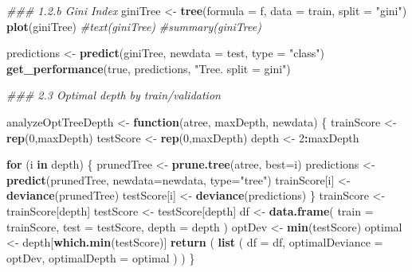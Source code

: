 \documentclass[
]{article}
\newenvironment{Shaded}{\begin{snugshade}}{\end{snugshade}}
\newcommand{\CommentTok}[1]{\textcolor[rgb]{0.56,0.35,0.01}{\textit{#1}}}
\newcommand{\ControlFlowTok}[1]{\textcolor[rgb]{0.13,0.29,0.53}{\textbf{#1}}}
\newcommand{\DataTypeTok}[1]{\textcolor[rgb]{0.13,0.29,0.53}{#1}}
\newcommand{\DecValTok}[1]{\textcolor[rgb]{0.00,0.00,0.81}{#1}}
\newcommand{\KeywordTok}[1]{\textcolor[rgb]{0.13,0.29,0.53}{\textbf{#1}}}
\newcommand{\NormalTok}[1]{#1}
\newcommand{\OperatorTok}[1]{\textcolor[rgb]{0.81,0.36,0.00}{\textbf{#1}}}
\newcommand{\StringTok}[1]{\textcolor[rgb]{0.31,0.60,0.02}{#1}}
\begin{document}
\begin{Shaded}
\begin{Highlighting}[]
\CommentTok{\#\#\# 1.2.b Gini Index}
\NormalTok{giniTree <{-}}\StringTok{ }\KeywordTok{tree}\NormalTok{(}\DataTypeTok{formula =}\NormalTok{ f, }\DataTypeTok{data =}\NormalTok{ train, }\DataTypeTok{split =} \StringTok{"gini"}\NormalTok{)}
\KeywordTok{plot}\NormalTok{(giniTree)}
\CommentTok{\#text(giniTree)}
\CommentTok{\#summary(giniTree)}

\NormalTok{predictions <{-}}\StringTok{ }\KeywordTok{predict}\NormalTok{(giniTree, }\DataTypeTok{newdata =}\NormalTok{ test, }\DataTypeTok{type =} \StringTok{"class"}\NormalTok{)}
\KeywordTok{get\_performance}\NormalTok{(true, predictions, }\StringTok{"Tree. split = gini"}\NormalTok{)}

\CommentTok{\#\#\# 2.3 Optimal depth by train/validation}

\NormalTok{analyzeOptTreeDepth <{-}}\StringTok{ }\ControlFlowTok{function}\NormalTok{(atree, maxDepth, newdata) \{}
\NormalTok{    trainScore <{-}}\StringTok{ }\KeywordTok{rep}\NormalTok{(}\DecValTok{0}\NormalTok{,maxDepth)}
\NormalTok{    testScore <{-}}\StringTok{ }\KeywordTok{rep}\NormalTok{(}\DecValTok{0}\NormalTok{,maxDepth)}
\NormalTok{    depth <{-}}\StringTok{ }\DecValTok{2}\OperatorTok{:}\NormalTok{maxDepth}
    
    \ControlFlowTok{for}\NormalTok{ (i }\ControlFlowTok{in}\NormalTok{ depth) \{}
\NormalTok{        prunedTree <{-}}\StringTok{ }\KeywordTok{prune.tree}\NormalTok{(atree, }\DataTypeTok{best=}\NormalTok{i)}
\NormalTok{        predictions <{-}}\StringTok{ }\KeywordTok{predict}\NormalTok{(prunedTree, }\DataTypeTok{newdata=}\NormalTok{newdata, }\DataTypeTok{type=}\StringTok{"tree"}\NormalTok{)}
\NormalTok{        trainScore[i] <{-}}\StringTok{ }\KeywordTok{deviance}\NormalTok{(prunedTree)}
\NormalTok{        testScore[i] <{-}}\StringTok{ }\KeywordTok{deviance}\NormalTok{(predictions)}
\NormalTok{    \}}
\NormalTok{    trainScore <{-}}\StringTok{ }\NormalTok{trainScore[depth]}
\NormalTok{    testScore <{-}}\StringTok{ }\NormalTok{testScore[depth]}
\NormalTok{    df <{-}}\StringTok{ }\KeywordTok{data.frame}\NormalTok{(}
        \DataTypeTok{train =}\NormalTok{ trainScore,}
        \DataTypeTok{test =}\NormalTok{ testScore, }
        \DataTypeTok{depth =}\NormalTok{ depth}
\NormalTok{    )   }
\NormalTok{    optDev <{-}}\StringTok{ }\KeywordTok{min}\NormalTok{(testScore)}
\NormalTok{    optimal <{-}}\StringTok{ }\NormalTok{depth[}\KeywordTok{which.min}\NormalTok{(testScore)]}
    \KeywordTok{return}\NormalTok{ ( }\KeywordTok{list}\NormalTok{ (}
            \DataTypeTok{df =}\NormalTok{ df, }
            \DataTypeTok{optimalDeviance =}\NormalTok{ optDev,}
            \DataTypeTok{optimalDepth =}\NormalTok{ optimal}
\NormalTok{        )}
\NormalTok{    )}
\NormalTok{\}}


\end{Highlighting}
\end{Shaded}
\end{document}

